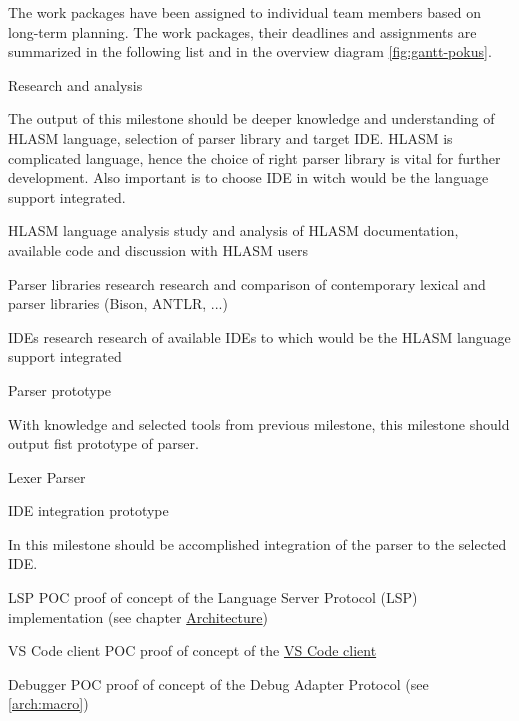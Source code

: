 The work packages have been assigned to individual team members based on long-term planning. The work packages, their deadlines and assignments are summarized in the following list and in the overview diagram \ref{fig:gantt-pokus}. 



\newpage

\bms
	\itemm Research and analysis 
	
		\small The output of this milestone should be deeper knowledge and understanding of HLASM language, selection of parser library and target IDE.
		HLASM is complicated language, hence the choice of right parser library is vital for further development. Also important is to choose IDE in witch would be the language support integrated.
	
		\bwp
			\itemwp HLASM language analysis 
					\tiny study and analysis of HLASM documentation, available code and discussion with HLASM users
					
			\itemwp Parser libraries research 
					\tiny research and comparison of contemporary lexical and parser libraries (Bison, ANTLR, ...) 
					
			\itemwp IDEs research 
					\tiny research of available IDEs to which would be the HLASM language support integrated
		\eenum
	
	
	\itemm Parser prototype 
	
		\small With knowledge and selected tools from previous milestone, this milestone should output fist prototype of parser.
	
		\bwp
			\itemwp Lexer 
			\itemwp Parser 
		\eenum
	
	
	\itemm IDE integration prototype 
	
		\small In this milestone should be accomplished integration of the parser to the selected IDE.
	
		\bwp
			\itemwp LSP POC 
					\tiny proof of concept of the Language Server Protocol (LSP) implementation (see chapter \hyperref[arch]{Architecture})
					
			\itemwp VS Code client POC 
					\tiny proof of concept of the \hyperref[arch:client]{VS Code client}
					
			\itemwp Debugger POC 
					\tiny proof of concept of the Debug Adapter Protocol (see \ref{arch:macro})
		\eenum
	
